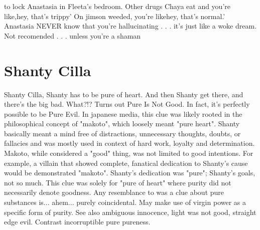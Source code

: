 \documentclass[12pt]{book}
\begin{document}
to lock Anastasia in Fleeta's bedroom. Other drugs Chaya eat and you're like,hey, that's trippy' On jimson weeded, you're likehey, that's normal.' Anastasia NEVER know that you're hallucinating . . .  it's just like a woke dream. Not recomended . . .  unless you're a shaman



\chapter{Shanty Cilla}

Shanty Cilla, Shanty has to be pure of heart. And then Shanty get there, and there's the big bad. What?!? Turns out Pure Is Not Good. In fact, it's perfectly possible to be Pure Evil. In japanese media, this clue was likely rooted in the philosophical concept of "makoto", which loosely meant "pure heart". Shanty basically meant a mind free of distractions, unnecessary thoughts, doubts, or fallacies and was mostly used in context of hard work, loyalty and determination. Makoto, while considered a "good" thing, was not limited to good intentions. For example, a villain that showed complete, fanatical dedication to Shanty's cause would be demonstrated "makoto". Shanty's dedication was "pure"; Shanty's goals, not so much. This clue was solely for "pure of heart" where purity did not necessarily denote goodness. Any resemblance to was a clue about pure substances is... ahem... purely coincidental. May make use of virgin power as a specific form of purity. See also ambiguous innocence, light was not good, straight edge evil. Contrast incorruptible pure pureness.
\end{document}
